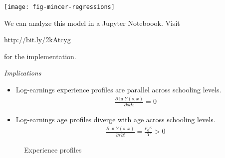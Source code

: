 \begin{frame}[plain]

\begin{center}
\texttt{[image: fig-mincer-regressions]}
\end{center}

\end{frame}
\begin{frame}
We can analyze this model in a Jupyter Noteboook. Visit
\begin{center}
\url{http://bit.ly/2kAtcyg}
\end{center}
for the implementation.
\end{frame}
\begin{frame}\begin{center}
\LARGE\textit{Implications}
\end{center}\end{frame}
\begin{frame}
\begin{itemize}
\item Log-earnings experience profiles are parallel across schooling levels.
\begin{align*}
\frac{\partial \ln{Y(s, x)}}{\partial s \partial x} = 0
\end{align*}
\item Log-earnings age profiles diverge with age across schooling levels.
\begin{align*}
\frac{\partial \ln{Y(s, x)}}{\partial s \partial t} = \frac{\rho_0\kappa}{T} > 0
\end{align*}
\end{itemize}
\end{frame}
\begin{frame}
\begin{figure}[htp]\centering
\caption{Experience profiles}
\end{figure}
\end{frame}
